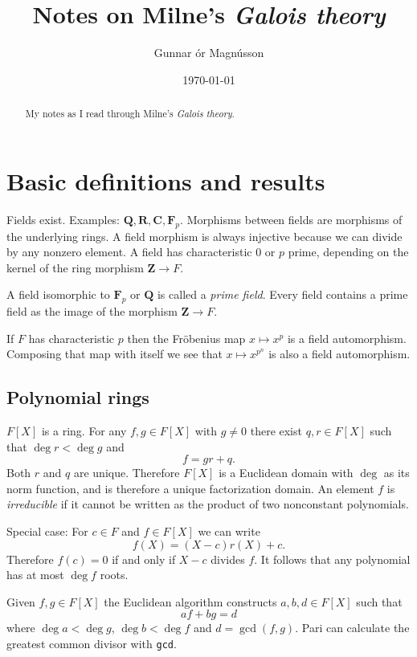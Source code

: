 \documentclass[11pt]{amsart}
\title[Galois theory]{Notes on Milne's \textit{Galois theory}}
\author{Gunnar \TH\'or Magn\'usson}
\date{\today}
\theoremstyle{definition}
\def\CC{\mathbf{C}}
\def\FF{\mathbf{F}}
\def\RR{\mathbf{R}}
\def\QQ{\mathbf{Q}}
\def\ZZ{\mathbf{Z}}
\begin{document}
\begin{abstract}
My notes as I read through Milne's \textit{Galois theory}.
\end{abstract}




\maketitle

\section{Basic definitions and results}

Fields exist.
Examples: $\QQ, \RR, \CC, \FF_p$.
Morphisms between fields are morphisms of the underlying rings.
A field morphism is always injective because we can divide by any nonzero element.
A field has characteristic $0$ or $p$ prime, depending on the kernel of the ring morphism $\ZZ \to F$.

A field isomorphic to $\FF_p$ or $\QQ$ is called a \emph{prime field}.
Every field contains a prime field as the image of the morphism $\ZZ \to F$.

If $F$ has characteristic $p$ then the Fr\"obenius map $x \mapsto x^p$ is a field automorphism.
Composing that map with itself we see that $x \mapsto x^{p^n}$ is also a field automorphism.


\subsection*{Polynomial rings}

$F[X]$ is a ring.
For any $f,g \in F[X]$ with $g \not= 0$ there exist $q,r \in F[X]$ such that $\deg r < \deg g$ and
\[
f = gr + q.
\]
Both $r$ and $q$ are unique.
Therefore $F[X]$ is a Euclidean domain with $\deg$ as its norm function, and is therefore a unique factorization domain.
An element $f$ is \emph{irreducible} if it cannot be written as the product of two nonconstant polynomials.

Special case:
For $c \in F$ and $f \in F[X]$ we can write
\[
f(X) = (X - c) r(X) + c.
\]
Therefore $f(c) = 0$ if and only if $X-c$ divides $f$.
It follows that any polynomial has at most $\deg f$ roots.

Given $f,g \in F[X]$ the Euclidean algorithm constructs $a,b,d \in F[X]$ such that
\[
af + bg = d
\]
where $\deg a < \deg g$, $\deg b < \deg f$ and $d = \gcd(f,g)$.
Pari can calculate the greatest common divisor with \verb+gcd+.
\end{document}

